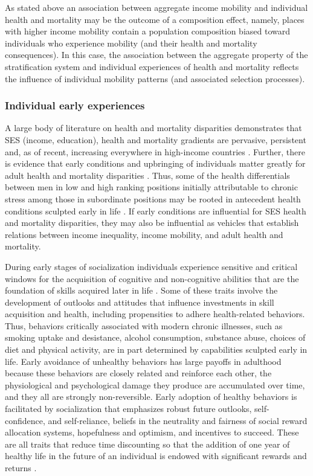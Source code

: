 \documentclass[11pt]{article}
\begin{document}
As stated above an association between aggregate income mobility and individual health and mortality may be the outcome of a composition effect, namely, places with higher income mobility contain a population composition biased toward individuals who experience mobility (and their health and mortality consequences). In this case, the association between the aggregate property of the stratification system and individual experiences of health and mortality reflects the influence of individual mobility patterns (and associated selection processes).

\subsubsection{Individual early experiences}

A large body of literature on health and mortality disparities demonstrates that SES (income, education), health and mortality gradients are pervasive, persistent and, as of recent, increasing everywhere in high-income countries \citep{MacKenbach2012, Meara2008}. Further, there is evidence that early conditions and upbringing of individuals matter greatly for adult health and mortality disparities \citep{Palloni2009,Case2002}. Thus, some of the health differentials between men in low and high ranking positions initially attributable to chronic stress among those in subordinate positions \citep{Marmot2004a, Sapolsky2005} may be rooted in antecedent health conditions sculpted early in life \citep{Case2011}. If early conditions are influential for SES health and mortality disparities, they may also be influential as vehicles that establish relations between income inequality, income mobility, and adult health and mortality. 

During early stages of socialization individuals experience sensitive and critical windows for the acquisition of cognitive and non-cognitive abilities that are the foundation of skills acquired later in life \citep{Knudsen.Heckman.ea2006, Shonkoff.Boyce.ea2009, Heckman2007, Cunha.Heckman2009}. Some of these traits involve the development of outlooks and attitudes that influence investments in skill acquisition and health, including propensities to adhere health-related behaviors. Thus, behaviors critically associated with modern chronic illnesses, such as smoking uptake and desistance, alcohol consumption, substance abuse, choices of diet and physical activity, are in part determined by capabilities sculpted early in life. Early avoidance of unhealthy behaviors has large payoffs in adulthood because these behaviors are closely related and reinforce each other, the physiological and psychological damage they produce are accumulated over time, and they all are strongly non-reversible. Early adoption of healthy behaviors is facilitated by socialization that emphasizes robust future outlooks, self-confidence, and self-reliance, beliefs in the neutrality and fairness of social reward allocation systems, hopefulness and optimism, and incentives to succeed. These are all traits that reduce time discounting so that the addition of one year of healthy life in the future of an individual is endowed with significant rewards and returns \citep{Grossman2000,Grossman1972}. 
\end{document}
